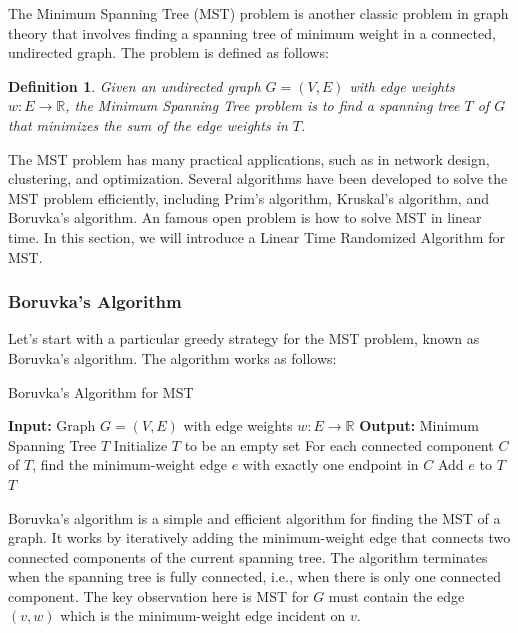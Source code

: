 \documentclass[11pt]{article}
\theoremstyle{plain}
\newtheorem{definition}{Definition}[section]
\begin{document}
The Minimum Spanning Tree (MST) problem is another classic problem in graph theory that involves finding a spanning tree of minimum weight in a connected, undirected graph. The problem is defined as follows:

\begin{definition}
    Given an undirected graph $G=(V,E)$ with edge weights $w:E\to \mathbb{R}$, the Minimum Spanning Tree problem is to find a spanning tree $T$ of $G$ that minimizes the sum of the edge weights in $T$.
\end{definition}

The MST problem has many practical applications, such as in network design, clustering, and optimization. Several algorithms have been developed to solve the MST problem efficiently, including Prim's algorithm, Kruskal's algorithm, and Boruvka's algorithm. An famous open problem is how to solve MST in linear time. In this section, we will introduce a Linear Time Randomized Algorithm for MST.

\subsubsection{Boruvka's Algorithm}

Let's start with a particular greedy strategy for the MST problem, known as Boruvka's algorithm. The algorithm works as follows:
\newline
\begin{algorithm}
\caption{Boruvka's Algorithm for MST}
\label{alg:boruvka}
\begin{algorithmic}[1]
    \STATE \textbf{Input:} Graph $G=(V,E)$ with edge weights $w:E\to \mathbb{R}$
    \STATE \textbf{Output:} Minimum Spanning Tree $T$
    \STATE Initialize $T$ to be an empty set
        \STATE For each connected component $C$ of $T$, find the minimum-weight edge $e$ with exactly one endpoint in $C$
        \STATE Add $e$ to $T$
    \ENDWHILE
    \RETURN $T$
\end{algorithmic}
\end{algorithm}

Boruvka's algorithm is a simple and efficient algorithm for finding the MST of a graph. It works by iteratively adding the minimum-weight edge that connects two connected components of the current spanning tree. The algorithm terminates when the spanning tree is fully connected, i.e., when there is only one connected component. The key observation here is MST for $G$ must contain the edge $(v,w)$ which is the minimum-weight edge incident on $v$.
\end{document}
